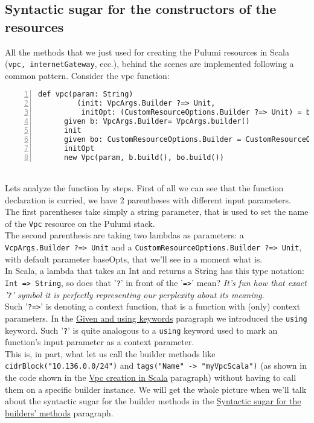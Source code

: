 \subsection{Syntactic sugar for the constructors of the resources}
All the methods that we just used for creating the Pulumi resources in Scala (\texttt{vpc, internetGateway}, ecc.), behind the scenes are implemented following a common pattern.
Consider the vpc function:
\begin{lstlisting}[numbers=left, numberstyle=\tiny, numbersep=-5pt, stepnumber=1]
  def vpc(param: String)
         (init: VpcArgs.Builder ?=> Unit,
          initOpt: (CustomResourceOptions.Builder ?=> Unit) = baseOpts): Vpc =
	  given b: VpcArgs.Builder= VpcArgs.builder()
	  init
	  given bo: CustomResourceOptions.Builder = CustomResourceOptions.builder()
	  initOpt
	  new Vpc(param, b.build(), bo.build())
\end{lstlisting}\mbox{}\\
Lets analyze the function by steps.
First of all we can see that the function declaration is curried, we have 2 parentheses with different input parameters.\\
The first parentheses take simply a string parameter, that is used to set the name of the \texttt{Vpc} resource on the Pulumi stack.\\
The second parenthesis are taking two lambdas as parameters: a \texttt{VcpArgs.Builder ?=> Unit}  and a \texttt{CustomResourceOptions.Builder ?=> Unit}, with default parameter baseOpts, that we'll see in a moment what is.\\
In Scala, a lambda that takes an Int and returns a String has this type notation: \texttt{Int => String}, so does that '\texttt{?}' in front of the '\texttt{=>}' mean?
\textit{It's fun how that exact '\texttt{?}' symbol it is perfectly representing our perplexity about its meaning}.\\
Such '\texttt{?=>}' is denoting a context function, that is a function with (only) context parameters.
In the \hyperref[par:given-using]{Given and using keywords} paragraph we introduced the \texttt{using} keyword.
Such '\texttt{?}' is quite analogous to a \texttt{using} keyword used to mark an function's input parameter as a context parameter.\\
This is, in part, what let us call the builder methods like \texttt{cidrBlock("10.136.0.0/24")} and \texttt{tags("Name" -> "myVpcScala")} (as shown in the code shown in the \hyperref[sssec:vpc-creation-scala]{Vpc creation in Scala} paragraph)
without having to call them on a specific builder instance.
We will get the whole picture when we'll talk about the syntactic sugar for the builder methods in the \hyperref[ssec:syn-sug-builders]{Syntactic sugar for the builders' methods} paragraph.

